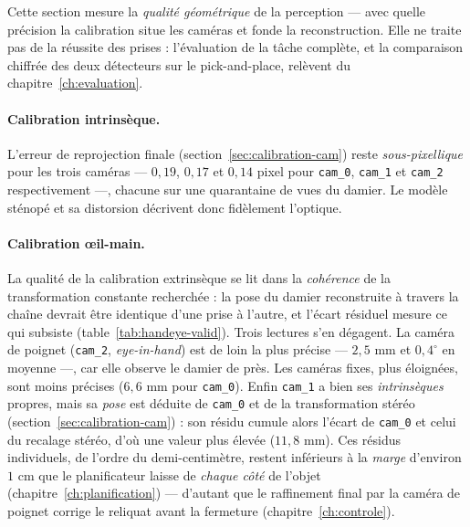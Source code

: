 Cette section mesure la \emph{qualité géométrique} de la perception --- avec quelle précision la calibration situe les caméras et fonde la reconstruction. Elle ne traite pas de la réussite des prises : l'évaluation de la tâche complète, et la comparaison chiffrée des deux détecteurs sur le pick-and-place, relèvent du chapitre~\ref{ch:evaluation}.

\paragraph{Calibration intrinsèque.} L'erreur de reprojection finale (section~\ref{sec:calibration-cam}) reste \emph{sous-pixellique} pour les trois caméras --- $0{,}19$, $0{,}17$ et $0{,}14$ pixel pour \texttt{cam\_0}, \texttt{cam\_1} et \texttt{cam\_2} respectivement ---, chacune sur une quarantaine de vues du damier. Le modèle sténopé et sa distorsion décrivent donc fidèlement l'optique.

\paragraph{Calibration œil-main.} La qualité de la calibration extrinsèque se lit dans la \emph{cohérence} de la transformation constante recherchée : la pose du damier reconstruite à travers la chaîne devrait être identique d'une prise à l'autre, et l'écart résiduel mesure ce qui subsiste (table~\ref{tab:handeye-valid}). Trois lectures s'en dégagent. La caméra de poignet (\texttt{cam\_2}, \emph{eye-in-hand}) est de loin la plus précise --- $2{,}5$ mm et $0{,}4^{\circ}$ en moyenne ---, car elle observe le damier de près. Les caméras fixes, plus éloignées, sont moins précises ($6{,}6$ mm pour \texttt{cam\_0}). Enfin \texttt{cam\_1} a bien ses \emph{intrinsèques} propres, mais sa \emph{pose} est déduite de \texttt{cam\_0} et de la transformation stéréo (section~\ref{sec:calibration-cam}) : son résidu cumule alors l'écart de \texttt{cam\_0} et celui du recalage stéréo, d'où une valeur plus élevée ($11{,}8$ mm). Ces résidus individuels, de l'ordre du demi-centimètre, restent inférieurs à la \emph{marge} d'environ $1$ cm que le planificateur laisse de \emph{chaque côté} de l'objet (chapitre~\ref{ch:planification}) --- d'autant que le raffinement final par la caméra de poignet corrige le reliquat avant la fermeture (chapitre~\ref{ch:controle}).

